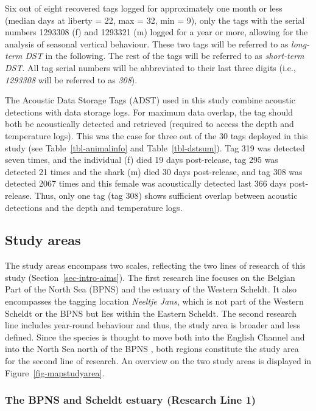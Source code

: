 \documentclass[
  authoryear,
  review,
  3p]{elsarticle}
\begin{document}
Six out of eight recovered tags logged for approximately one month or
less (median days at liberty = 22, max = 32, min = 9), only the tags
with the serial numbers 1293308 (f) and 1293321 (m) logged for a year or
more, allowing for the analysis of seasonal vertical behaviour. These
two tags will be referred to as \emph{long-term DST} in the following.
The rest of the tags will be referred to as \emph{short-term DST}. All
tag serial numbers will be abbreviated to their last three digits (i.e.,
\emph{1293308} will be referred to as \emph{308}).

The Acoustic Data Storage Tags (ADST) used in this study combine
acoustic detections with data storage logs. For maximum data overlap,
the tag should both be acoustically detected and retrieved (required to
access the depth and temperature logs). This was the case for three out
of the 30 tags deployed in this study (see Table~\ref{tbl-animalinfo}
and Table~\ref{tbl-dstsum}). Tag 319 was detected seven times, and the
individual (f) died 19 days post-release, tag 295 was detected 21 times
and the shark (m) died 30 days post-release, and tag 308 was detected
2067 times and this female was acoustically detected last 366 days
post-release. Thus, only one tag (tag 308) shows sufficient overlap
between acoustic detections and the depth and temperature logs.

\hypertarget{sec-mm_studyarea}{%
\subsection{Study areas}\label{sec-mm_studyarea}}

The study areas encompass two scales, reflecting the two lines of
research of this study (Section~\ref{sec-intro-aims}). The first
research line focuses on the Belgian Part of the North Sea (BPNS) and
the estuary of the Western Scheldt. It also encompasses the tagging
location \emph{Neeltje Jans}, which is not part of the Western Scheldt
or the BPNS but lies within the Eastern Scheldt. The second research
line includes year-round behaviour and thus, the study area is broader
and less defined. Since the species is thought to move both into the
English Channel and into the North Sea north of the BPNS
\citep{breve_2016, griffiths_2020}, both regions constitute the study
area for the second line of research. An overview on the two study areas
is displayed in Figure~\ref{fig-mapstudyarea}.

\hypertarget{sec-mmscheldtBPNS}{%
\subsubsection{The BPNS and Scheldt estuary (Research Line
1)}\label{sec-mmscheldtBPNS}}
\end{document}
